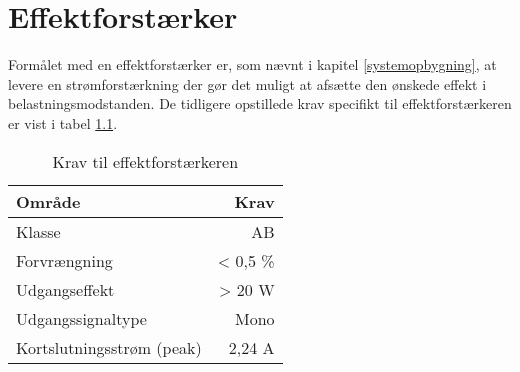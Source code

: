 \chapter{Effektforstærker}
\label{effektforstaerker}
Formålet med en effektforstærker er, som nævnt i kapitel \ref{systemopbygning}, at levere en strømforstærkning der gør det muligt at afsætte den ønskede effekt i belastningsmodstanden. De tidligere opstillede krav specifikt til effektforstærkeren er vist i tabel \ref{tab:krav_effektforstaerker}.

\begin{table}[h]
\centering
\begin{tabular}{l|r}
\hline\hline
Område & Krav \\
\hline\hline
Klasse & AB \\[4pt]
Forvrængning & < 0,5 \% \\[4pt]
Udgangseffekt & > 20 W \\[4pt]
Udgangssignaltype & Mono \\[4pt]
Kortslutningsstrøm (peak) & 2,24 A \\
\hline\hline
\end{tabular}
\caption{Krav til effektforstærkeren}
\label{tab:krav_effektforstaerker}
\end{table}